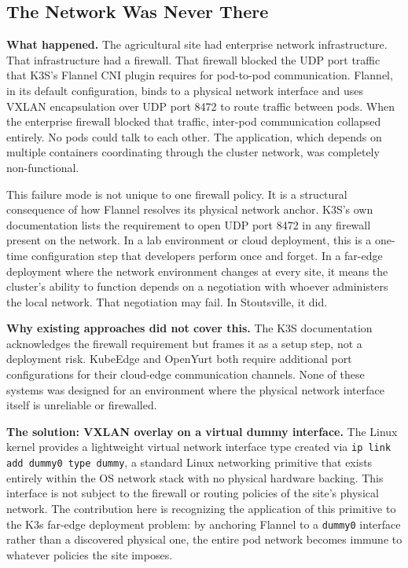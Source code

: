 \subsection{The Network Was Never There}
\label{subsec:ch3_network_mismatch}

\textbf{What happened.} The agricultural site had enterprise network infrastructure. That infrastructure had a firewall. That firewall blocked the UDP port traffic that K3S's Flannel CNI plugin requires for pod-to-pod communication. Flannel, in its default configuration, binds to a physical network interface and uses VXLAN encapsulation over UDP port 8472 to route traffic between pods. When the enterprise firewall blocked that traffic, inter-pod communication collapsed entirely. No pods could talk to each other. The application, which depends on multiple containers coordinating through the cluster network, was completely non-functional.

This failure mode is not unique to one firewall policy. It is a structural consequence of how Flannel resolves its physical network anchor. K3S's own documentation lists the requirement to open UDP port 8472 in any firewall present on the network. In a lab environment or cloud deployment, this is a one-time configuration step that developers perform once and forget. In a far-edge deployment where the network environment changes at every site, it means the cluster's ability to function depends on a negotiation with whoever administers the local network. That negotiation may fail. In Stoutsville, it did.

\textbf{Why existing approaches did not cover this.} The K3S documentation acknowledges the firewall requirement but frames it as a setup step, not a deployment risk. KubeEdge and OpenYurt both require additional port configurations for their cloud-edge communication channels. None of these systems was designed for an environment where the physical network interface itself is unreliable or firewalled.

\textbf{The solution: VXLAN overlay on a virtual dummy interface.} The Linux kernel provides a lightweight virtual network interface type created via \texttt{ip link add dummy0 type dummy}, a standard Linux networking primitive that exists entirely within the OS network stack with no physical hardware backing. This interface is not subject to the firewall or routing policies of the site's physical network. The contribution here is recognizing the application of this primitive to the K3s far-edge deployment problem: by anchoring Flannel to a \texttt{dummy0} interface rather than a discovered physical one, the entire pod network becomes immune to whatever policies the site imposes.

